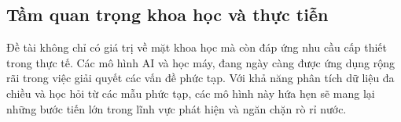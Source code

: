 \subsection{Tầm quan trọng khoa học và thực tiễn}
Đề tài không chỉ có giá trị về mặt khoa học mà còn đáp ứng nhu cầu cấp thiết trong thực tế. Các mô hình AI và học máy, đang ngày càng được ứng dụng rộng rãi trong việc giải quyết các vấn đề phức tạp. Với khả năng phân tích dữ liệu đa chiều và học hỏi từ các mẫu phức tạp, các mô hình này hứa hẹn sẽ mang lại những bước tiến lớn trong lĩnh vực phát hiện và ngăn chặn rò rỉ nước.
